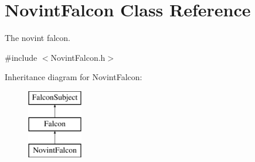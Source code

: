 \hypertarget{classNovintFalcon}{
\section{NovintFalcon Class Reference}
\label{classNovintFalcon}
}


The novint falcon.  




{\ttfamily \#include $<$NovintFalcon.h$>$}

Inheritance diagram for NovintFalcon:\begin{figure}[H]
\begin{center}
\leavevmode
\includegraphics[height=3.000000cm]{classNovintFalcon}
\end{center}
\end{figure}
